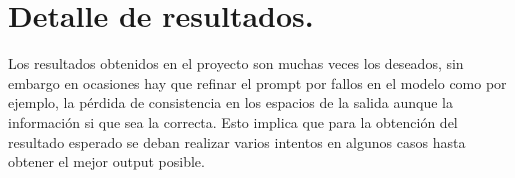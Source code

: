 \section{Detalle de resultados.}

Los resultados obtenidos en el proyecto son muchas veces los deseados, sin embargo en ocasiones hay que refinar el prompt por fallos en el modelo como por ejemplo, la pérdida de consistencia en los espacios de la salida aunque la información si que sea la correcta. Esto implica que para la obtención del resultado esperado se deban realizar varios intentos en algunos casos hasta obtener el mejor output posible. 